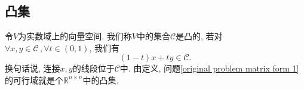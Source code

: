 \subsection{凸集}
令$V$为实数域上的向量空间. 我们称$V$中的集合$\mathcal{C}$是凸的, 若对$\forall x,y\in\mathcal{C}\,,\forall t\in(0,1)$, 我们有
	\begin{equation*}
	(1-t)x+ty\in\mathcal{C}.
	\end{equation*}
	换句话说, 连接$x,y$的线段位于$\mathcal{C}$中. 由定义, 问题\eqref{original problem matrix form 1}的可行域就是个$\mathbb{R}^{n\times n}$中的凸集.